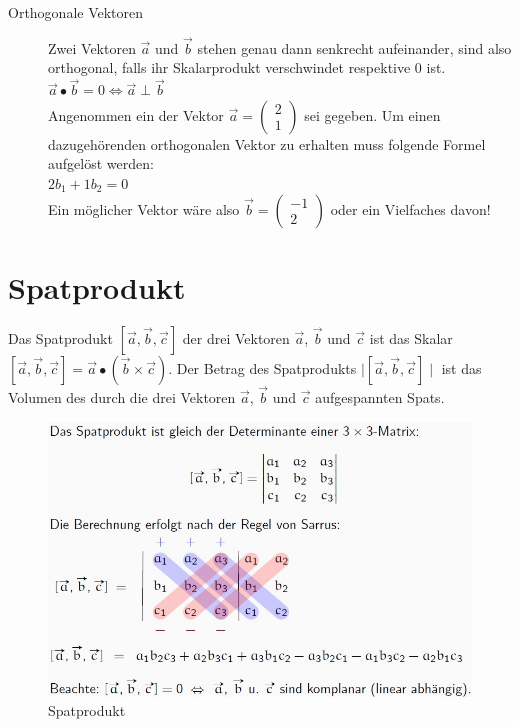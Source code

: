 \begin{description}
	\item[Orthogonale Vektoren]
	Zwei Vektoren $\vec{a}$ und $\vec{b}$ stehen genau dann senkrecht aufeinander, sind also orthogonal, falls ihr Skalarprodukt verschwindet respektive 0 ist.\\
	\begin{math}
		\vec{a} \bullet \vec{b} = 0 \iff \vec{a} \perp \vec{b}
	\end{math}
	\\Angenommen ein der Vektor $\vec{a} = \begin{pmatrix} 2 \\ 1 \end{pmatrix}$ sei gegeben. Um einen dazugehörenden orthogonalen Vektor zu erhalten muss folgende Formel aufgelöst werden:\\
	\begin{math}
		2b_{1} + 1b_2 = 0
	\end{math}
	\\Ein möglicher Vektor wäre also $\vec{b} = \begin{pmatrix} -1 \\ 2 \end{pmatrix}$ oder ein Vielfaches davon!
\end{description}
\section{Spatprodukt}

Das Spatprodukt $[\vec{a}, \vec{b}, \vec{c}]$ der drei Vektoren $\vec{a}$, $\vec{b}$ und $\vec{c}$ ist das Skalar $[\vec{a}, \vec{b}, \vec{c}] = \vec{a} \bullet (\vec{b} \times \vec{c})$.
Der Betrag des Spatprodukts $\mid [\vec{a}, \vec{b}, \vec{c}] \mid$ ist das Volumen des durch die drei Vektoren $\vec{a}$, $\vec{b}$ und $\vec{c}$ aufgespannten Spats.

\begin{figure}[!ht]
	\centering
	\includegraphics[width=0.7\linewidth]{fig/spatprodukt}
	\caption{Spatprodukt}
	\label{fig:spatprodukt}
\end{figure}

